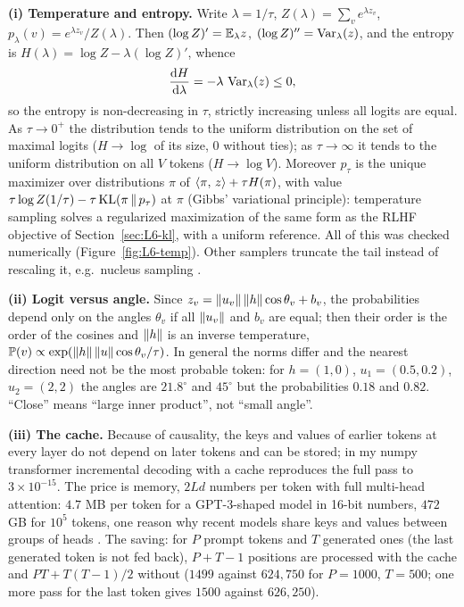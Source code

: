 \begin{beyond}\label{box:L6-temp}
\textbf{(i) Temperature and entropy.} Write $\lambda=1/\tau$, $Z(\lambda)=\sum_ve^{\lambda z_v}$, $p_\lambda(v)=e^{\lambda z_v}/Z(\lambda)$. Then $(\log Z)'=\mathbb{E}_{\lambda}z$, $(\log Z)''=\operatorname{Var}_\lambda(z)$, and the entropy is $H(\lambda)=\log Z-\lambda(\log Z)'$, whence
\[
  \frac{\mathrm{d} H}{\mathrm{d}\lambda}=-\lambda\,\operatorname{Var}_{\lambda}(z)\le0 ,
\]
so the entropy is non-decreasing in $\tau$, strictly increasing unless all logits are equal. As $\tau\to0^+$ the distribution tends to the uniform distribution on the set of maximal logits ($H\to\log$ of its size, $0$ without ties); as $\tau\to\infty$ it tends to the uniform distribution on all $V$ tokens ($H\to\log V$). Moreover $p_\tau$ is the unique maximizer over distributions $\pi$ of $\left\langle \pi,\,z\right\rangle+\tau H(\pi)$, with value $\tau\log Z(1/\tau)-\tau\operatorname{KL}(\pi\,\|\,p_\tau)$ at $\pi$ (Gibbs' variational principle): temperature sampling solves a regularized maximization of the same form as the RLHF objective of Section~\ref{sec:L6-kl}, with a uniform reference. All of this was checked numerically (Figure~\ref{fig:L6-temp}). Other samplers truncate the tail instead of rescaling it, e.g.\ nucleus sampling \citep{holtzman2020}.

\textbf{(ii) Logit versus angle.} Since $z_v=\left\lVert u_v\right\rVert\left\lVert h\right\rVert\cos\theta_v+b_v$, the probabilities depend only on the angles $\theta_v$ if all $\left\lVert u_v\right\rVert$ and $b_v$ are equal; then their order is the order of the cosines and $\left\lVert h\right\rVert$ is an inverse temperature, $\mathbb{P}(v)\propto\exp(\left\lVert h\right\rVert\left\lVert u\right\rVert\cos\theta_v/\tau)$. In general the norms differ and the nearest direction need not be the most probable token: for $h=(1,0)$, $u_1=(0.5,0.2)$, $u_2=(2,2)$ the angles are $21.8^\circ$ and $45^\circ$ but the probabilities $0.18$ and $0.82$. ``Close'' means ``large inner product'', not ``small angle''.

\textbf{(iii) The cache.} Because of causality, the keys and values of earlier tokens at every layer do not depend on later tokens and can be stored; in my numpy transformer incremental decoding with a cache reproduces the full pass to $3\times10^{-15}$. The price is memory, $2Ld$ numbers per token with full multi-head attention: $4.7$ MB per token for a GPT-3-shaped model in 16-bit numbers, $472$ GB for $10^5$ tokens, one reason why recent models share keys and values between groups of heads \citep{ainslie2023}. The saving: for $P$ prompt tokens and $T$ generated ones (the last generated token is not fed back), $P+T-1$ positions are processed with the cache and $PT+T(T-1)/2$ without ($1499$ against $624{,}750$ for $P=1000$, $T=500$; one more pass for the last token gives $1500$ against $626{,}250$).


\end{beyond}
